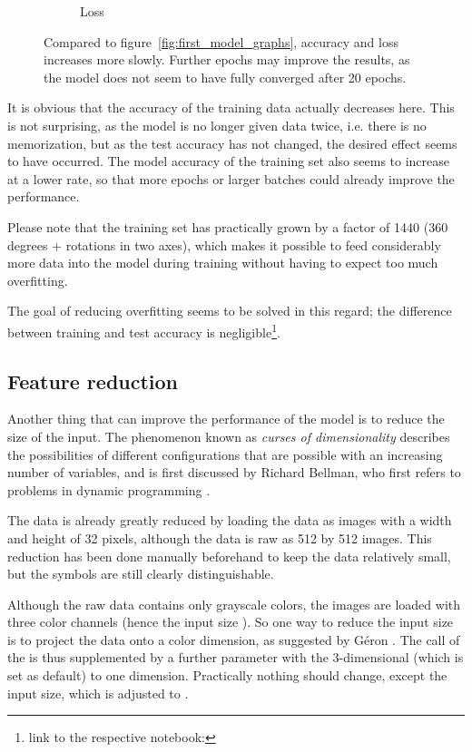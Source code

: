 \begin{figure}
\begin{subfigure}[b]{0.4\textwidth}
        \caption{Loss}
        \label{fig:first_model_data_augmentation_loss}
    \end{subfigure}
    \caption[Training after first augmentation]{Compared to figure~\ref{fig:first_model_graphs}, accuracy and loss increases more slowly. Further epochs may improve the results, as the model does not seem to have fully converged after 20 epochs.}
    \label{fig:first_model_data_augmentation_graphs}
\end{figure}

It is obvious that the accuracy of the training data actually decreases here.
This is not surprising, as the model is no longer given data twice, i.e. there is no memorization, but as the test accuracy has not changed, the desired effect seems to have occurred.
The model accuracy of the training set also seems to increase at a lower rate, so that more epochs or larger batches could already improve the performance.

Please note that the training set has practically grown by a factor of 1440 (360 degrees + rotations in two axes), which makes it possible to feed considerably more data into the model during training without having to expect too much overfitting.

The goal of reducing overfitting seems to be solved in this regard; the difference between training and test accuracy is negligible\footnote{link to the respective notebook: }.

\subsection{Feature reduction}

Another thing that can improve the performance of the model is to reduce the size of the input.
The phenomenon known as \textit{curses of dimensionality} describes the possibilities of different configurations that are possible with an increasing number of variables, and is first discussed by Richard Bellman, who first refers to problems in dynamic programming \cite[p.ix]{Bellman1957}.

The data is already greatly reduced by loading the data as images with a width and height of 32 pixels, although the data is raw as 512 by 512 images. This reduction has been done manually beforehand to keep the data relatively small, but the symbols are still clearly distinguishable.

Although the raw data contains only grayscale colors, the images are loaded with three color channels (hence the input size \code{[32, 32, 3]}).
So one way to reduce the input size is to project the data onto a color dimension, as suggested by Géron \cite[p.215]{Geron2019}.
The call of the  is thus supplemented by a further parameter  with the 3-dimensional  (which is set as default) to one dimension.
Practically nothing should change, except the input size, which is adjusted to \code{[32, 32, 1]}.

